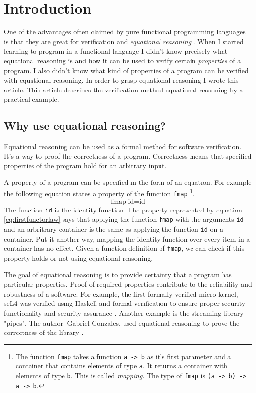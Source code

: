 \section{Introduction}
\label{sec:This}

One of the advantages often claimed by pure functional programming languages is that they are great for \gls{verification} and \emph{equational reasoning} \cite{Wadler87}.
When I started learning to program in a functional language I didn't know precisely what equational reasoning is and how it can be used to verify certain \emph{properties} of a program. I also didn't know what kind of properties of a program can be verified with equational reasoning. In order to grasp equational reasoning I wrote this article.
This article describes the verification method equational reasoning by a practical example. 

\subsection{Why use equational reasoning?}

Equational reasoning can be used as a formal method for software verification. It's a way to proof the correctness of a program. Correctness means that specified properties of the program hold for an arbitrary input. 

A property of a program can be specified in the form of an equation. For example the following equation states a property of the function \verb|fmap|  \footnote{The function \verb|fmap| takes a function \verb|a -> b| as it's first parameter and a container that contains elements of type \verb|a|. It returns a container with elements of type \verb|b|. This is called \emph{mapping}. The type of \verb|fmap| is \verb|(a -> b) -> a -> b|.}.
\begin{equation}
  \label{eq:firstfunctorlaw}
\text{fmap } \text{id}  =  \text{id}  
\end{equation}
 The function \verb|id| is the identity function. The property represented by equation \ref{eq:firstfunctorlaw} says that applying the function \verb|fmap| with the arguments \verb|id| and an arbritrary container is the same as applying the function \verb|id| on a container. Put it another way, mapping the identity function over every item in a container has no effect. Given a function definition of \verb|fmap|, we can check if this property holds or not using equational reasoning.

The goal of equational reasoning is to provide certainty that a program has particular properties. Proof of required properties contribute to the reliability and robustness of a software. 
For example, the first formally verified micro kernel, seL4 was verified using Haskell and formal verification to ensure proper security functionality and security assurance \cite{Klein09}.
Another example is the streaming library "pipes". The author, Gabriel Gonzales, used equational reasoning to prove the correctness of the library \cite{gonzales13}.


